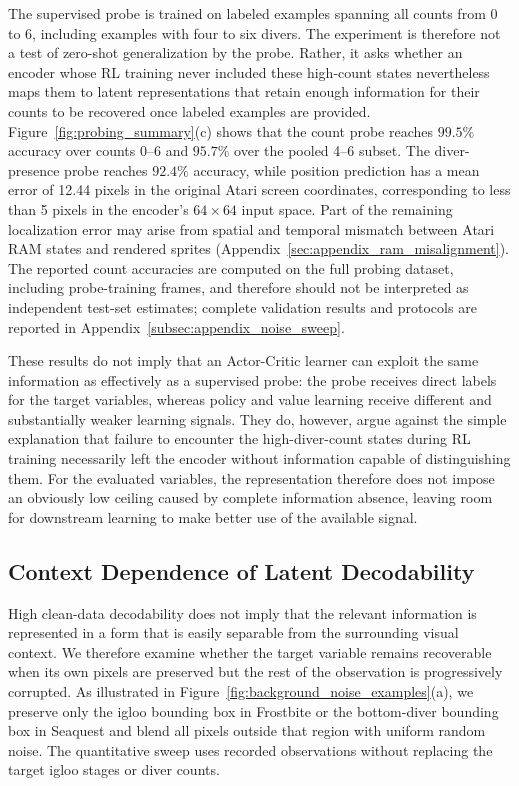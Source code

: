 \documentclass{article} %
\begin{document}
The supervised probe is trained on labeled examples spanning all counts from 0 to 6, including examples with four to six divers. The experiment is therefore not a test of zero-shot generalization by the probe. Rather, it asks whether an encoder whose RL training never included these high-count states nevertheless maps them to latent representations that retain enough information for their counts to be recovered once labeled examples are provided. Figure~\ref{fig:probing_summary}(c) shows that the count probe reaches $99.5\%$ accuracy over counts 0--6 and $95.7\%$ over the pooled 4--6 subset. The diver-presence probe reaches $92.4\%$ accuracy, while position prediction has a mean error of 12.44 pixels in the original Atari screen coordinates, corresponding to less than 5 pixels in the encoder's $64\times64$ input space. Part of the remaining localization error may arise from spatial and temporal mismatch between Atari RAM states and rendered sprites (Appendix~\ref{sec:appendix_ram_misalignment}). The reported count accuracies are computed on the full probing dataset, including probe-training frames, and therefore should not be interpreted as independent test-set estimates; complete validation results and protocols are reported in Appendix~\ref{subsec:appendix_noise_sweep}.

These results do not imply that an Actor-Critic learner can exploit the same information as effectively as a supervised probe: the probe receives direct labels for the target variables, whereas policy and value learning receive different and substantially weaker learning signals. They do, however, argue against the simple explanation that failure to encounter the high-diver-count states during RL training necessarily left the encoder without information capable of distinguishing them. For the evaluated variables, the representation therefore does not impose an obviously low ceiling caused by complete information absence, leaving room for downstream learning to make better use of the available signal.

\subsection{Context Dependence of Latent Decodability}
\label{subsec:context_dependence}

High clean-data decodability does not imply that the relevant information is represented in a form that is easily separable from the surrounding visual context. We therefore examine whether the target variable remains recoverable when its own pixels are preserved but the rest of the observation is progressively corrupted. As illustrated in Figure~\ref{fig:background_noise_examples}(a), we preserve only the igloo bounding box in Frostbite or the bottom-diver bounding box in Seaquest and blend all pixels outside that region with uniform random noise. The quantitative sweep uses recorded observations without replacing the target igloo stages or diver counts.
\end{document}
